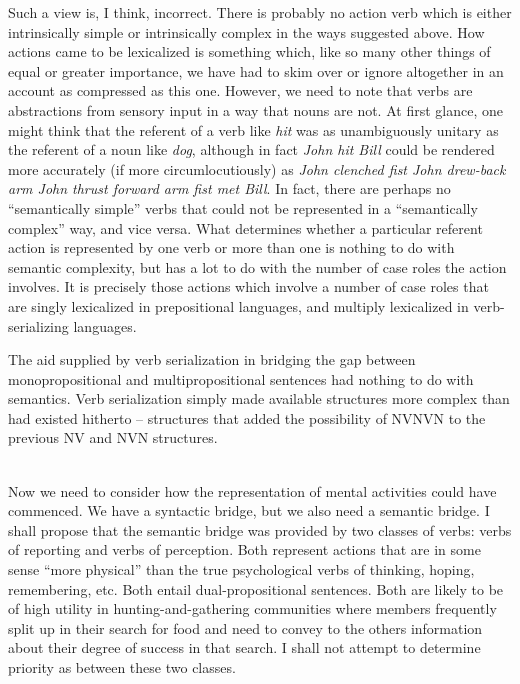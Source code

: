 Such a view is, I think, incorrect. There is probably no action verb which is either intrinsically simple or intrinsically complex in the ways suggested above. How actions came to be lexicalized is something which, like so many other things of equal or greater importance, we
have had to skim over or ignore altogether in an account as compressed as this one. However, we need to note that verbs are abstractions from sensory input in a way that nouns are not. At first glance, one might think that the referent of a verb like \textit{hit} was as unambiguously unitary as the referent of a noun like \textit{dog}, although in fact \textit{John hit Bill} could be rendered more accurately (if more circumlocutiously) as \textit{John clenched fist John drew-back arm John thrust forward arm fist met Bill}. In fact, there are perhaps no ``semantically simple'' verbs that could not be represented in a ``semantically complex'' way, and vice versa. What determines whether a particular referent action is repre\-sented by one verb or more than one is nothing to do with semantic complexity, but has a lot to do with the number of case roles the action involves. It is precisely those actions which involve a number of case roles that are singly lexicalized in prepositional languages, and multiply lexicalized in verb-serializing languages.

The aid supplied by verb serialization in bridging the gap between monopropositional and multipropositional sentences had nothing to do with semantics. Verb serialization simply made available structures more complex than had existed hitherto -- structures that added the possibility of NVNVN to the previous NV and NVN structures.\\\\

Now we need to consider how the representation of mental activities could have commenced. We have a syntactic bridge, but we also need a semantic bridge. I shall propose that the semantic bridge was provided by two classes of verbs: verbs of reporting and verbs of perception. Both represent actions that are in some sense ``more physical'' than the true psychological verbs of thinking, hoping, remembering, etc. Both entail dual-propositional sentences. Both are likely to be of high utility in hunting-and-gathering communities where members frequently split up in their search for food and need to con\-vey to the others information about their degree of success in that search. I shall not attempt to determine priority as between these two classes.

